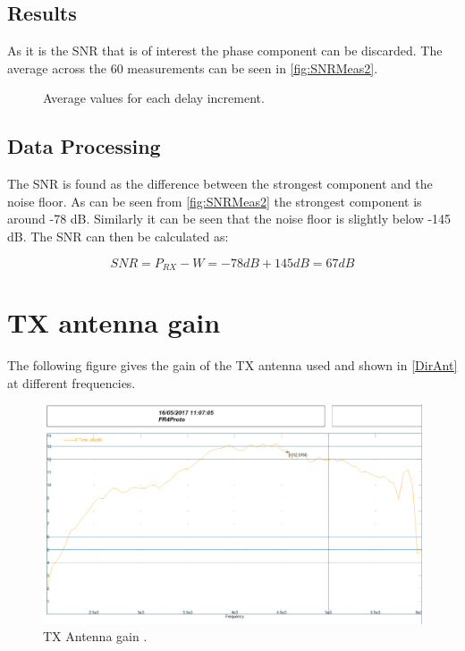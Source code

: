 \subsection{Results}
As it is the SNR that is of interest the phase component can be discarded. The average across the 60 measurements can be seen in \autoref{fig:SNRMeas2}.

\begin{figure}[H]
\centering

\caption{Average values for each delay increment.}
\label{fig:SNRMeas2}
\end{figure}

\subsection{Data Processing}
The SNR is found as the difference between the strongest component and the noise floor. As can be seen from \autoref{fig:SNRMeas2} the strongest component is around -78 dB. Similarly it can be seen that the noise floor is slightly below -145 dB. The SNR can then be calculated as:

\begin{equation}
SNR = P_{RX} - W = -78dB + 145dB = 67 dB
\end{equation}
\begin{where}
\end{where}

\newpage
\section{TX antenna gain}
\label{ant_adix}
The following figure gives the gain of the TX antenna used and shown in \autoref{DirAnt} at different frequencies.  

\begin{figure}[H]
\centering
\includegraphics[width=1\textwidth]{figures/Fr4Proto1Gain.png}
\caption{TX Antenna gain \citep{TX_antenna}.}
\label{fig:TX_gain}
\end{figure}